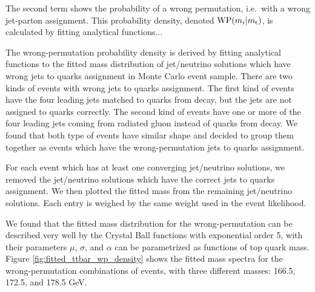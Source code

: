 The second term shows the probability of a wrong permutation, i.e.\ with a wrong jet-parton assignment. This
probability density, denoted $\textrm{WP}(m_i|m_\mathrm{t})$, is calculated by fitting analytical functions...

The wrong-permutation probability density is derived by fitting analytical functions to the fitted mass distribution of
jet/neutrino solutions which have wrong jets to quarks assignment in Monte Carlo \ttbar event sample.  There are two
kinds of events with wrong jets to quarks assignment.  The first kind of events have the four leading jets matched to
quarks from \ttbar decay, but the jets are not assigned to quarks correctly.  The second kind of events have one or more
of the four leading jets coming from radiated gluon instead of quarks from \ttbar decay.  We found that both type of
events have similar shape and decided to group them together as events which have the wrong-permutation jets to quarks
assignment.

For each event which has at least one converging jet/neutrino solutions, we removed the jet/neutrino solutions which
have the correct jets to quarks assignment. We then plotted the fitted mass from the remaining jet/neutrino solutions.
Each entry is weighed by the same weight used in the event likelihood.

We found that the fitted mass distribution for the wrong-permutation \ttbar can be described very well by the Crystal
Ball functions with exponential order 5, with their parameters $\mu$, $\sigma$, and $\alpha$ can be parametrized as
functions of top quark mass.  Figure \ref{fig:fitted_ttbar_wp_density} shows the fitted mass spectra for the
wrong-permutation combinations of \ttbar events, with three different masses: 166.5, 172.5, and 178.5 GeV.

